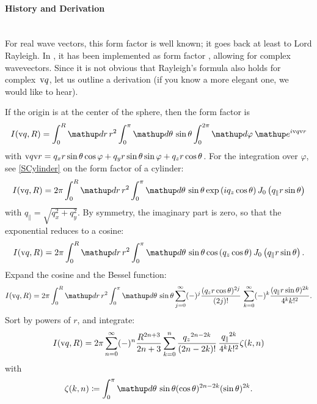 \paragraph{History and Derivation}\strut\\
For real wave vectors, this form factor is well known;
it goes back at least to Lord Rayleigh.
In \IsGISAXS, it has been implemented as form factor 
\cite[Eq.~2.36]{Laz08} \cite[Eq.~226]{ReLL09},
allowing for complex wavevectors.
Since it is not obvious that Rayleigh's formula also holds for complex~$\text{v}{q}$,
let us outline a derivation
(if you know a more elegant one, we would like to hear).

If the origin is at the center of the sphere, then the form factor is
\begin{equation}
I(\q,R)
 = \int_0^R\d r\, r^2\int_0^{\pi}\d\theta\,\sin\theta\int_0^{2\pi}\d\varphi
  \:\e^{i\q\r}
\end{equation}
with $\text{v}{q}\text{v}{r}
= q_x r\sin\theta\cos\varphi + q_y r\sin\theta\sin\varphi + q_z r\cos\theta$.
For the integration over $\varphi$,
see \cref{SCylinder} on the form factor of a cylinder:
\begin{equation}
  I(\q,R)
  = 2\pi \int_0^R \d r\,r^2 \int_0^{\pi} \d\theta\, \sin\theta
   \exp\left(i q_z \cos \theta\right) J_0\left(q_\parallel r\sin \theta\right)
\end{equation}
with $q_{\parallel}=\sqrt{q_x^2+q_y^2}$.
By symmetry, the imaginary part is zero,
so that the exponential reduces to a cosine:
\begin{equation}
  I(\q,R)
  = 2\pi \int_0^R \d r\,r^2 \int_0^{\pi} \d\theta\, \sin\theta
   \cos\left(q_z \cos \theta\right) J_0\left(q_\parallel r\sin \theta\right).
\end{equation}
Expand the cosine and the Bessel function:
\begin{equation}
  I(\q,R)
  = 2\pi \int_0^R \d r\,r^2 \int_0^{\pi} \d\theta\, \sin\theta
    \sum_{j=0}^\infty (-)^j \frac{(q_zr\cos\theta)^{2j}}{(2j)!}\,
    \sum_{k=0}^{\infty} (-)^k \frac{(q_\parallel r \sin\theta)^{2k}}{4^k k!^2}.
\end{equation}
Sort by powers of $r$, and integrate:
\begin{equation}
  I(\text{v}{q},R)
  = 2\pi \sum_{n=0}^\infty (-)^n \frac{R^{2n+3}}{2n+3} \sum_{k=0}^n
    \frac{{q_z}^{2n-2k}}{(2n-2k)!}\,\frac{{q_\parallel}^{2k}}{4^k k!^2} \zeta(k,n)
\end{equation}
with
\begin{equation}
  \zeta(k,n)
  \coloneqq \int_0^{\pi} \d\theta\, \sin\theta
  (\cos\theta)^{2n-2k}(\sin\theta)^{2k}.
\end{equation}
